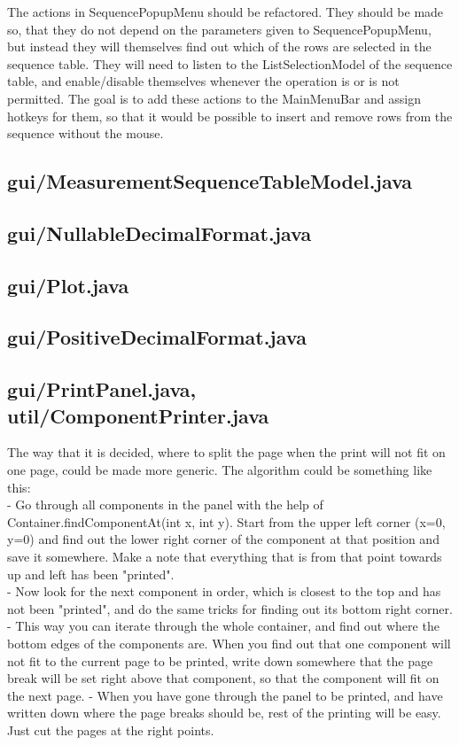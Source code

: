 The actions in SequencePopupMenu should be refactored. They should be made so, that they do not depend on the parameters given to SequencePopupMenu, but instead they will themselves find out which of the rows are selected in the sequence table. They will need to listen to the ListSelectionModel of the sequence table, and enable/disable themselves whenever the operation is or is not permitted. The goal is to add these actions to the MainMenuBar and assign hotkeys for them, so that it would be possible to insert and remove rows from the sequence without the mouse.


\subsection{gui/MeasurementSequenceTableModel.java}

\subsection{gui/NullableDecimalFormat.java}

\subsection{gui/Plot.java}

\subsection{gui/PositiveDecimalFormat.java}

\subsection{gui/PrintPanel.java, util/ComponentPrinter.java}

The way that it is decided, where to split the page when the print will not fit on one page, could be made more generic. The algorithm could be something like this: \\
- Go through all components in the panel with the help of Container.findComponentAt(int x, int y). Start from the upper left corner (x=0, y=0) and find out the lower right corner of the component at that position and save it somewhere. Make a note that everything that is from that point towards up and left has been "printed". \\
- Now look for the next component in order, which is closest to the top and has not been "printed", and do the same tricks for finding out its bottom right corner. \\
- This way you can iterate through the whole container, and find out where the bottom edges of the components are. When you find out that one component will not fit to the current page to be printed, write down somewhere that the page break will be set right above that component, so that the component will fit on the next page.
- When you have gone through the panel to be printed, and have written down where the page breaks should be, rest of the printing will be easy. Just cut the pages at the right points.



